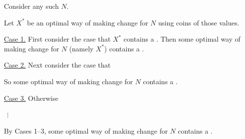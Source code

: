 \begin{longFormProof}

  \step Consider any such $N$.

  \step Let $X^*$ be an optimal way of making change for $N$ using coins of those values.

  \smallskip 

  \begin{block}
    \step \underline{Case 1.}  First consider the case that $X^*$ contains a \BLUE{
      \REPLACEME              %
    }.
    \step Then some optimal way of making change for $N$ (namely $X^*$) contains a \BLUE{
      \REPLACEME              %
    }.
  \end{block}

  \smallskip 

  \begin{block}

    \step \underline{Case 2.}  Next consider the case that \BLUE{
      \REPLACEME
    }

    \begin{blue}

      \step \REPLACEME          %

    \end{blue}

    \step So some optimal way of making change for $N$ contains a \BLUE{
      \REPLACEME              %
    }.
    
  \end{block}

  \smallskip 

  \begin{block}

    \step \underline{Case 3.}  Otherwise 

    \begin{blue}
      \step \REPLACEME

      \step \REPLACEME

      \step $~~\vdots$              %

    \end{blue}

  \end{block}

  \smallskip 

  \step By Cases 1--3, some optimal way of making change for $N$ contains a
  \BLUE{
    \REPLACEME              %
  }.

\end{longFormProof}


